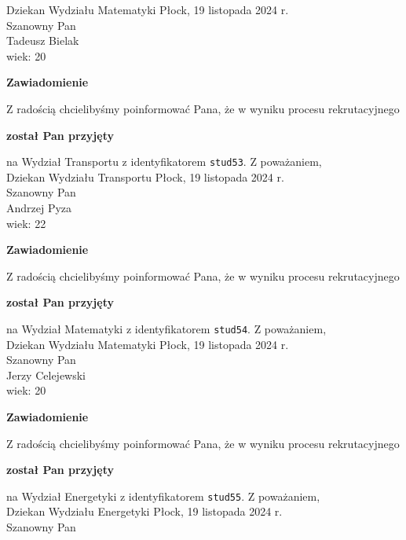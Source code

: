 \documentclass[12pt,a4paper]{article}
\begin{document}
Dziekan
Wydziału Matematyki
\newpage
\hfill Płock, 19 listopada 2024 r. \\
\noindent
Szanowny Pan \\
Tadeusz Bielak \\
wiek: 20
\bigskip
\begin{center}
    {\Large\textbf{Zawiadomienie}}
\end{center}
\bigskip 
Z radością chcielibyśmy poinformować Pana, że w wyniku procesu rekrutacyjnego
\begin{center}
\textsf{\textbf{został Pan przyjęty}}
\end{center}
na Wydział Transportu z identyfikatorem \verb|stud53|. 
\vspace{2cm}
\noindent
Z poważaniem, \\
Dziekan
Wydziału Transportu
\newpage
\hfill Płock, 19 listopada 2024 r. \\
\noindent
Szanowny Pan \\
Andrzej Pyza \\
wiek: 22
\bigskip
\begin{center}
    {\Large\textbf{Zawiadomienie}}
\end{center}
\bigskip 
Z radością chcielibyśmy poinformować Pana, że w wyniku procesu rekrutacyjnego
\begin{center}
\textsf{\textbf{został Pan przyjęty}}
\end{center}
na Wydział Matematyki z identyfikatorem \verb|stud54|. 
\vspace{2cm}
\noindent
Z poważaniem, \\
Dziekan
Wydziału Matematyki
\newpage
\hfill Płock, 19 listopada 2024 r. \\
\noindent
Szanowny Pan \\
Jerzy Celejewski \\
wiek: 20
\bigskip
\begin{center}
    {\Large\textbf{Zawiadomienie}}
\end{center}
\bigskip 
Z radością chcielibyśmy poinformować Pana, że w wyniku procesu rekrutacyjnego
\begin{center}
\textsf{\textbf{został Pan przyjęty}}
\end{center}
na Wydział Energetyki z identyfikatorem \verb|stud55|. 
\vspace{2cm}
\noindent
Z poważaniem, \\
Dziekan
Wydziału Energetyki
\newpage
\hfill Płock, 19 listopada 2024 r. \\
\noindent
Szanowny Pan \\
\end{document}
